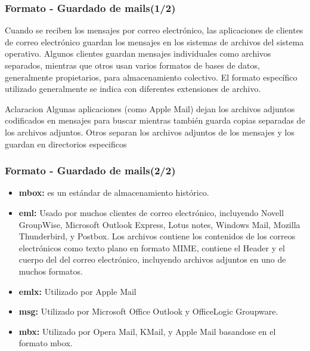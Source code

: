 \documentclass{beamer}
\begin{document}
\begin{frame}
\frametitle{Formato - Guardado de mails(1/2)}
\tableofcontents
\small Cuando se reciben los mensajes por correo electrónico, las aplicaciones de clientes de correo electrónico guardan los mensajes en los sistemas de archivos del sistema operativo. Algunos clientes guardan mensajes individuales como archivos separados, mientras que otros usan varios formatos de bases de datos, generalmente propietarios, para almacenamiento colectivo. El formato específico utilizado generalmente se indica con diferentes extensiones de archivo.

\begin{block}{Aclaracion}
\footnotesize Algunas aplicaciones (como Apple Mail) dejan los archivos adjuntos codificados en mensajes para buscar mientras también guarda copias separadas de los archivos adjuntos. Otros separan los archivos adjuntos de los mensajes y los guardan en directorios especificos
\end{block}

\end{frame}

\begin{frame}
\frametitle{Formato - Guardado de mails(2/2)}
\tableofcontents
\begin{itemize}
\item \small \textbf{mbox:} es un estándar de almacenamiento histórico.
\item \small \textbf{eml:} Usado por muchos clientes de correo electrónico, incluyendo Novell GroupWise, Microsoft Outlook Express, Lotus notes, Windows Mail, Mozilla Thunderbird, y Postbox. Los archivos contiene los contenidos de los correos electrónicos como texto plano en formato MIME, contiene el Header y el cuerpo del del correo electrónico, incluyendo archivos adjuntos en  uno de muchos formatos.
\item \small \textbf{emlx:} Utilizado por Apple Mail
\item \small \textbf{msg:} Utilizado por Microsoft Office Outlook y OfficeLogic Groupware.
\item \small \textbf{mbx:} Utilizado por Opera Mail, KMail, y Apple Mail basandose en el formato mbox.
\end{itemize}

\end{frame}
\end{document}
